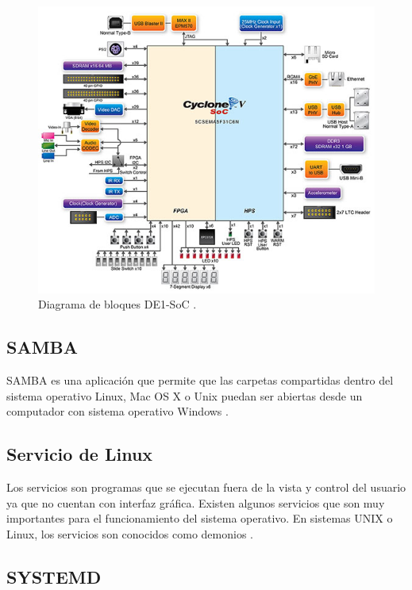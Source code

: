 \begin{figure}[htpb]
	\centering
	\includegraphics[scale=0.7]{Figures/fpgablock.jpg}  
	\caption{Diagrama de bloques DE1-SoC \protect\footnotemark.}
	\label{fig:DE1BLOCK}
\end{figure}



\subsection{SAMBA}
SAMBA es una aplicación que permite que las carpetas compartidas dentro del sistema operativo Linux, Mac OS X o Unix  puedan ser abiertas desde un computador con sistema operativo Windows \citep{WIKISAMBA}.

\subsection{Servicio de Linux}

Los servicios son programas que se ejecutan fuera de la vista y control del usuario ya que no cuentan con interfaz gráfica. Existen algunos servicios que son muy importantes para el funcionamiento del sistema operativo.
En sistemas UNIX o Linux, los servicios son conocidos como demonios \citep{SERVICIO}.

\subsection{SYSTEMD}

